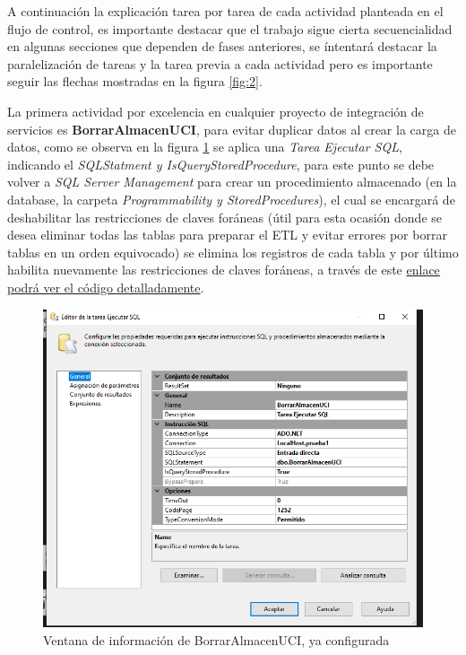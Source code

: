 \documentclass[12pt, a4paper, twoside]{article}
\begin{document}
	A continuación la explicación tarea por tarea de cada actividad planteada en el flujo de control, es importante destacar que el trabajo sigue cierta secuencialidad en algunas secciones que dependen de fases anteriores, se íntentará destacar la paralelización de tareas y la tarea previa a cada actividad pero es importante seguir las flechas mostradas en la figura \ref{fig:2}. 
	
	La primera actividad por excelencia en cualquier proyecto de integración de servicios es \textbf{BorrarAlmacenUCI}, para evitar duplicar datos al crear la carga de datos, como se observa en la figura \ref{fig:3} se aplica una \textit{Tarea Ejecutar SQL}, indicando el \textit{SQLStatment y IsQueryStoredProcedure}, para este punto se debe volver a \textit{SQL Server Management} para crear un procedimiento almacenado (en la database, la carpeta \textit{Programmability y StoredProcedures}), el cual se encargará de deshabilitar las restricciones de claves foráneas (útil para esta ocasión donde se desea eliminar todas las tablas para preparar el ETL y evitar errores por borrar tablas en un orden equivocado) se elimina los registros de cada tabla y por último habilita nuevamente las restricciones de claves foráneas, a través de este \href{https://github.com/Diegodepab/almacen_UCI_Sanitaria/blob/main/ETL/BorrarAlmacenUCI.sql}{enlace podrá ver el código detalladamente}.

	\begin{figure}[H]
		\centering
		\includegraphics[width=1\textwidth]{image/101_BorrarAlmacenUCI.png}
		\caption{Ventana de información de BorrarAlmacenUCI, ya configurada}
		\label{fig:3}
	\end{figure}
	
\end{document}
